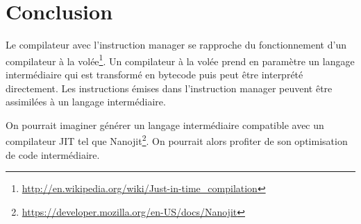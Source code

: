 \section{Conclusion}

        Le compilateur avec l'instruction manager se rapproche du fonctionnement d'un compilateur à la volée\footnote{\url{http://en.wikipedia.org/wiki/Just-in-time\_compilation}}. Un compilateur à la volée prend en paramètre un langage intermédiaire qui est transformé en bytecode puis peut être interprété directement. Les instructions émises dans l'instruction manager peuvent être assimilées à un langage intermédiaire. 
    
    On pourrait imaginer générer un langage intermédiaire compatible avec un compilateur JIT tel que Nanojit\footnote{\url{https://developer.mozilla.org/en-US/docs/Nanojit}}. On pourrait alors profiter de son optimisation de code intermédiaire.
        
